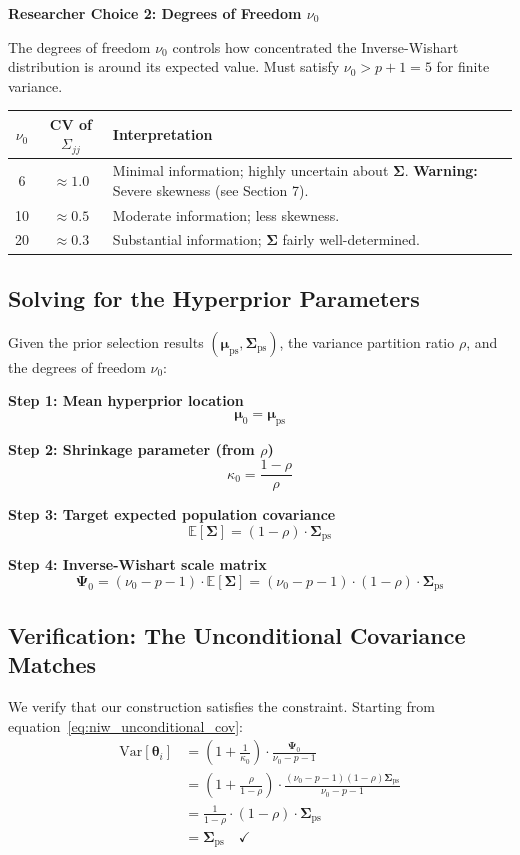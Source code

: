 \documentclass[11pt]{article}
\newcommand{\E}{\mathbb{E}}
\newcommand{\Var}{\text{Var}}
\begin{document}
\textbf{Researcher Choice 2: Degrees of Freedom $\nu_0$}

The degrees of freedom $\nu_0$ controls how concentrated the Inverse-Wishart distribution is around its expected value. Must satisfy $\nu_0 > p + 1 = 5$ for finite variance.

\begin{center}
\begin{tabular}{ccp{8cm}}
\toprule
$\nu_0$ & CV of $\Sigma_{jj}$ & Interpretation \\
\midrule
6 & $\approx 1.0$ & Minimal information; highly uncertain about $\boldsymbol{\Sigma}$. \textbf{Warning:} Severe skewness (see Section 7). \\
10 & $\approx 0.5$ & Moderate information; less skewness. \\
20 & $\approx 0.3$ & Substantial information; $\boldsymbol{\Sigma}$ fairly well-determined. \\
\bottomrule
\end{tabular}
\end{center}

\subsection{Solving for the Hyperprior Parameters}

Given the prior selection results $(\boldsymbol{\mu}_{\text{ps}}, \boldsymbol{\Sigma}_{\text{ps}})$, the variance partition ratio $\rho$, and the degrees of freedom $\nu_0$:

\textbf{Step 1: Mean hyperprior location}
\[
  \boldsymbol{\mu}_0 = \boldsymbol{\mu}_{\text{ps}}
\]

\textbf{Step 2: Shrinkage parameter (from $\rho$)}
\[
  \kappa_0 = \frac{1 - \rho}{\rho}
\]

\textbf{Step 3: Target expected population covariance}
\[
  \E[\boldsymbol{\Sigma}] = (1 - \rho) \cdot \boldsymbol{\Sigma}_{\text{ps}}
\]

\textbf{Step 4: Inverse-Wishart scale matrix}
\[
  \boldsymbol{\Psi}_0 = (\nu_0 - p - 1) \cdot \E[\boldsymbol{\Sigma}] = (\nu_0 - p - 1) \cdot (1 - \rho) \cdot \boldsymbol{\Sigma}_{\text{ps}}
\]

\subsection{Verification: The Unconditional Covariance Matches}

We verify that our construction satisfies the constraint. Starting from equation~\eqref{eq:niw_unconditional_cov}:
\begin{align*}
  \Var[\boldsymbol{\theta}_i] &= \left(1 + \frac{1}{\kappa_0}\right) \cdot \frac{\boldsymbol{\Psi}_0}{\nu_0 - p - 1} \\
  &= \left(1 + \frac{\rho}{1-\rho}\right) \cdot \frac{(\nu_0 - p - 1)(1-\rho)\boldsymbol{\Sigma}_{\text{ps}}}{\nu_0 - p - 1} \\
  &= \frac{1}{1-\rho} \cdot (1-\rho) \cdot \boldsymbol{\Sigma}_{\text{ps}} \\
  &= \boldsymbol{\Sigma}_{\text{ps}} \quad \checkmark
\end{align*}
\end{document}
